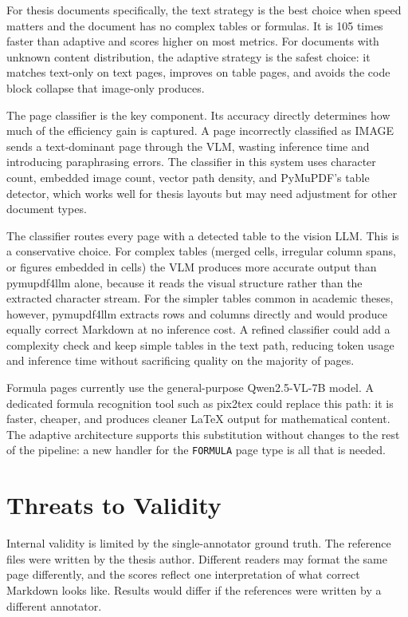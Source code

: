 For thesis documents specifically, the text strategy is the best choice
when speed matters and the document has no complex tables or formulas.
It is 105 times faster than adaptive and scores higher on most metrics.
For documents with unknown content distribution, the adaptive strategy
is the safest choice: it matches text-only on text pages, improves on
table pages, and avoids the code block collapse that image-only produces.

The page classifier is the key component. Its accuracy directly
determines how much of the efficiency gain is captured. A page
incorrectly classified as IMAGE sends a text-dominant page through the
VLM, wasting inference time and introducing paraphrasing errors. The
classifier in this system uses character count, embedded image count,
vector path density, and PyMuPDF's table detector, which works well for
thesis layouts but may need adjustment for other document types.

The classifier routes every page with a detected table to the vision LLM.
This is a conservative choice.
For complex tables (merged cells, irregular column spans, or figures embedded
in cells) the VLM produces more accurate output than pymupdf4llm alone, because
it reads the visual structure rather than the extracted character stream.
For the simpler tables common in academic theses, however, pymupdf4llm extracts
rows and columns directly and would produce equally correct Markdown at no
inference cost.
A refined classifier could add a complexity check and keep simple tables in the
text path, reducing token usage and inference time without sacrificing quality
on the majority of pages.

Formula pages currently use the general-purpose Qwen2.5-VL-7B model.
A dedicated formula recognition tool such as pix2tex could replace
this path: it is faster, cheaper, and produces cleaner LaTeX output
for mathematical content. The adaptive
architecture supports this substitution without changes to the rest of
the pipeline: a new handler for the \texttt{FORMULA} page type is
all that is needed.

\section{Threats to Validity}

Internal validity is limited by the single-annotator ground truth. The
reference files were written by the thesis author. Different readers may
format the same page differently, and the scores reflect one interpretation
of what correct Markdown looks like. Results would differ if the references
were written by a different annotator.


